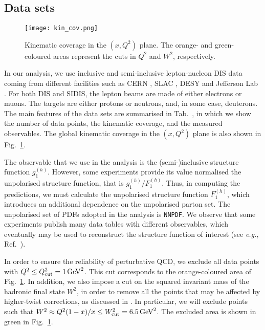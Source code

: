 \subsection*{Data sets}
\begin{figure}[t]
  \centering
  \texttt{[image: kin\_cov.png]} 
  \caption{\small{Kinematic coverage in the $(x,Q^2)$ plane. The orange- and green-coloured areas represent the cuts in $Q^2$ and $W^2$, respectively.}}
  \label{fig:kin_cov}
\end{figure}
In our analysis, we use inclusive and semi-inclusive lepton-nucleon DIS data coming from different facilities such as CERN \cite{EuropeanMuon:1989yki, Heiliger:1993qt, COMPASS:2006mhr, COMPASS:2010wkz, COMPASS:2010hwr}, SLAC \cite{E142:1993hql, E143:1998hbs, E154:1997xfa, E155:2000qdr}, DESY \cite{HERMES:2018awh, HERMES:2006jyl, HERMES:1997hjr} and Jefferson Lab \cite{Kramer:2002tt, JeffersonLabHallA:2004tea, CLAS:2014qtg}. For both DIS and SIDIS, the lepton beams are made of either electrons or muons. The targets are either protons or neutrons, and, in some case, deuterons. The main features of the data sets are summarised in Tab.~, in which we show the number of data points, the kinematic coverage, and the measured observables. The global kinematic coverage in the $(x,Q^2)$ plane is also shown in Fig.~\ref{fig:kin_cov}. \par
The observable that we use in the analysis is the (semi-)inclusive structure function $g_1^{(h)}$. However, some experiments provide its value normalised the unpolarised structure function, that is $g_1^{(h)}/F_1^{(h)}$. Thus, in computing the predictions, we must calculate the unpolarised structure function $F_1^{(h)}$, which introduces an additional dependence on the unpolarised parton set. The unpolarised set of PDFs adopted in the analysis is \texttt{NNPDF}. We observe that some experiments publish many data tables with different observables, which eventually may be used to reconstruct the structure function of interest (see \textit{e.g.}, Ref.~\cite{Nocera:2014vla}).\par
In order to ensure the reliability of perturbative QCD, we exclude all data points with $Q^2 \leq Q^2_{\textrm{cut}} = 1 \, \textrm{GeV}^2$. This cut corresponds to the orange-coloured area of Fig.~\ref{fig:kin_cov}. In addition, we also impose a cut on the squared invariant mass of the hadronic final state $W^2$, in order to remove all the points that may be affected by higher-twist corrections, as discussed in . In particular, we will exclude points such that $W^2 \approx Q^2 (1-x)/x \leq W^2_{\textrm{cut}} = 6.5 \, \textrm{GeV}^2$. The excluded area  is shown in green in Fig.~\ref{fig:kin_cov}.\par
